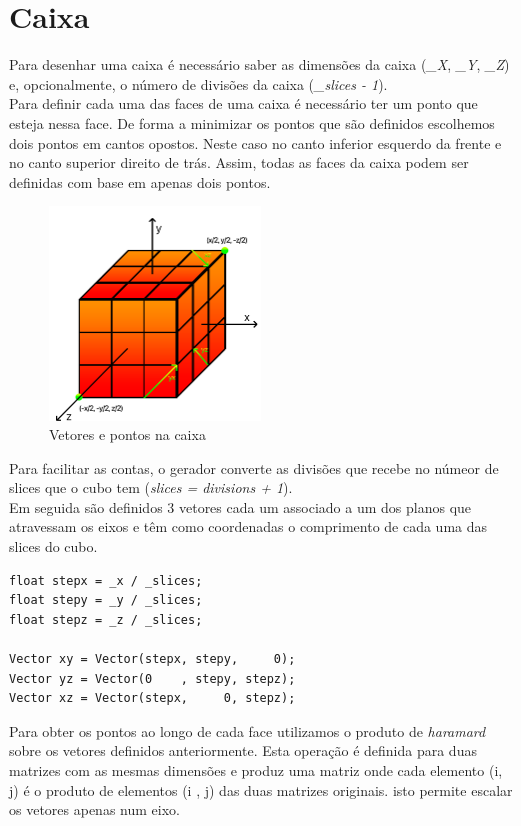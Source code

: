\documentclass[a4paper]{report}
\begin{document}
\section{Caixa}
Para desenhar uma caixa é necessário saber as dimensões da caixa (\textit{\_X},
\textit{\_Y}, \textit{\_Z}) e, opcionalmente, o número de divisões da caixa
(\textit{\_slices - 1}).\\
Para definir cada uma das faces de uma caixa é necessário ter um ponto que
esteja nessa face. De forma a minimizar os pontos que são definidos escolhemos
dois pontos em cantos opostos. Neste caso no canto inferior esquerdo da frente e
no canto superior direito de trás. Assim, todas as faces da caixa podem ser
definidas com base em apenas dois pontos.\\
\begin{figure}[H]
    \centering 
    \includegraphics[width=0.5\textwidth]{images/cubo_vectors.png}  
    \caption{Vetores e pontos na caixa}
    \label{fig:box_vectors}
\end{figure}
Para facilitar as contas, o gerador converte as divisões que recebe no númeor de
slices que o cubo tem (\textit{slices = divisions + 1}).\\
Em seguida são definidos 3 vetores cada um associado a um dos planos que
atravessam os eixos e têm como coordenadas o comprimento de cada uma das slices
do cubo.\\
\begin{lstlisting}
float stepx = _x / _slices;
float stepy = _y / _slices;
float stepz = _z / _slices;

Vector xy = Vector(stepx, stepy,     0);
Vector yz = Vector(0    , stepy, stepz);
Vector xz = Vector(stepx,     0, stepz);
\end{lstlisting}
Para obter os pontos ao longo de cada face utilizamos o produto de
\textit{haramard} sobre os vetores definidos anteriormente. Esta operação é
definida para duas matrizes com as mesmas dimensões e produz uma matriz onde
cada elemento (i, j) é o produto de elementos (i , j) das duas matrizes
originais. isto permite escalar os vetores apenas num eixo.\\
\end{document}
